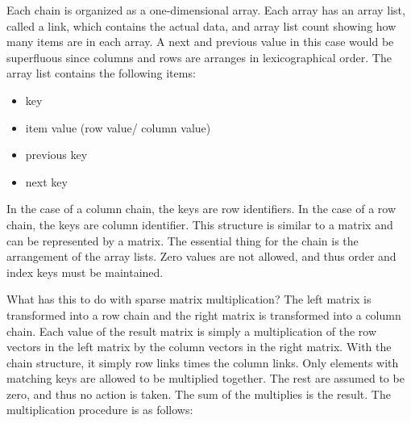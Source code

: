 Each chain is organized as a one-dimensional array.  Each array has an array list, called a link, which contains the actual data, and array list count showing how many items are in each array.  A next and previous value in this case would be superfluous since columns and rows are arranges in lexicographical order.  The array list contains the following items:
\begin{itemize}
\item key
\item item value (row value/ column value)
\item previous key
\item next key 
\end{itemize}

In the case of a column chain, the keys are row identifiers.   In the case of a row chain, the keys are column identifier.  This structure is similar to a matrix and can be represented by a matrix.  The essential thing for the chain is the arrangement of the array lists.  Zero values are not allowed, and thus order and index keys must be maintained.  

What has this to do with sparse matrix multiplication?  The left matrix is transformed into a row chain and the right matrix is transformed into a column chain.  Each value of the result matrix is simply a multiplication of the row vectors in the left matrix by the column vectors in the right matrix.  With the chain structure, it simply row links times the column links.  Only elements with matching keys are allowed to be multiplied together.  The rest are assumed to be zero, and thus no action is taken.  The sum of the multiplies is the result.  The multiplication procedure is as follows:

